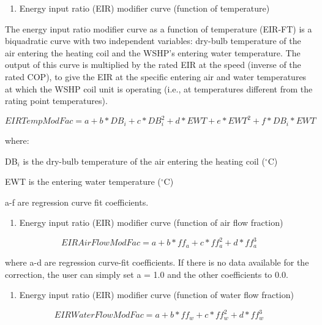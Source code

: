 \begin{enumerate}
\def\labelenumi{\arabic{enumi})}
\setcounter{enumi}{3}
\tightlist
\item
  Energy input ratio (EIR) modifier curve (function of temperature)
\end{enumerate}

The energy input ratio modifier curve as a function of temperature (EIR-FT) is a biquadratic curve with two independent variables: dry-bulb temperature of the air entering the heating coil and the WSHP's entering water temperature. The output of this curve is multiplied by the rated EIR at the speed (inverse of the rated COP), to give the EIR at the specific entering air and water temperatures at which the WSHP coil unit is operating (i.e., at temperatures different from the rating point temperatures).

\begin{equation}
EIRTempModFac = a + b*D{B_i} + c*DB_i^2 + d*EWT + e*EW{T^2} + f*D{B_i}*EWT
\end{equation}

where:

DB\(_{i}\) is the dry-bulb temperature of the air entering the heating coil (\(^{\circ}\)C)

EWT is the entering water temperature (\(^{\circ}\)C)

a-f are regression curve fit coefficients.

\begin{enumerate}
\def\labelenumi{\arabic{enumi})}
\setcounter{enumi}{4}
\tightlist
\item
  Energy input ratio (EIR) modifier curve (function of air flow fraction)
\end{enumerate}

\begin{equation}
EIRAirFlowModFac = a + b*f{f_a} + c*ff_a^2 + d*ff_a^3
\end{equation}

where a-d are regression curve-fit coefficients.  If there is no data available for the correction, the user can simply set a = 1.0 and the other coefficients to 0.0.

\begin{enumerate}
\def\labelenumi{\arabic{enumi})}
\setcounter{enumi}{5}
\tightlist
\item
  Energy input ratio (EIR) modifier curve (function of water flow fraction)
\end{enumerate}

\begin{equation}
EIRWaterFlowModFac = a + b*f{f_w} + c*ff_w^2 + d*ff_w^3
\end{equation}

